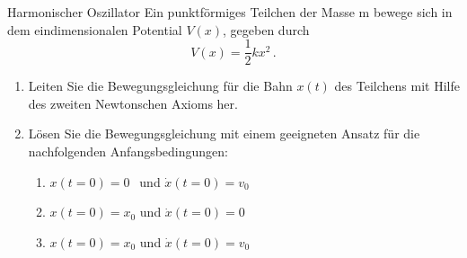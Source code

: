 \newpage
\setcounter{punkte}{4}
\begin{aufgabe}{Harmonischer Oszillator}
Ein punktförmiges Teilchen der Masse m bewege sich in dem eindimensionalen
Potential $V(x)$, gegeben durch
\begin{equation}
  V(x) = \frac{1}{2}kx^2 \, .
\end{equation}
\renewcommand{\labelenumi}{\alph{enumi})}
\renewcommand{\labelenumii}{(\roman{enumii})}
\begin{enumerate}
    \item Leiten Sie die Bewegungsgleichung für die Bahn $x(t)$ des Teilchens mit Hilfe des
    zweiten Newtonschen Axioms her.
    \item Lösen Sie die Bewegungsgleichung mit einem geeigneten Ansatz für die nachfolgenden
    Anfangsbedingungen:
    \begin{enumerate}
      \item $x(t=0) = 0$ $\: \:$und $\dot{x}(t=0) = v_0$
      \item $x(t=0) = x_0$ und $\dot{x}(t=0) = 0$
      \item $x(t=0) = x_0$ und $\dot{x}(t=0) = v_0$
    \end{enumerate}
\end{enumerate}
\end{aufgabe}

%
%
